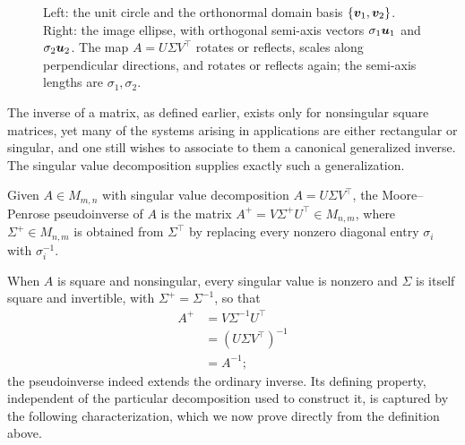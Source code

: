 \begin{figure}[!htbp]
\centering
{}
\caption[Singular Value Decomposition (SVD)]{Left: the unit circle and the orthonormal domain basis $\{\bm{v}_1,\bm{v}_2\}$. Right: the image ellipse, with orthogonal semi-axis vectors $\sigma_1\bm{u}_1$ and $\sigma_2\bm{u}_2$. The map $A=U\Sigma V^\top$ rotates or reflects, scales along perpendicular directions, and rotates or reflects again; the semi-axis lengths are $\sigma_1,\sigma_2$.}
\label{fig:ch10-svd}
\end{figure}

The inverse of a matrix, as defined earlier, exists only for nonsingular square matrices, yet many of the systems arising in applications are either rectangular or singular, and one still wishes to associate to them a canonical generalized inverse. The singular value decomposition supplies exactly such a generalization.

\begin{definition}[Pseudoinverse]
Given $A \in M_{m,n}$ with singular value decomposition $A = U\Sigma V^{\top}$, the Moore--Penrose pseudoinverse of $A$ is the matrix $A^{+} = V \Sigma^{+} U^{\top} \in M_{n,m}$, where $\Sigma^{+} \in M_{n,m}$ is obtained from $\Sigma^{\top}$ by replacing every nonzero diagonal entry $\sigma_i$ with $\sigma_i^{-1}$.
\end{definition}

When $A$ is square and nonsingular, every singular value is nonzero and $\Sigma$ is itself square and invertible, with $\Sigma^{+} = \Sigma^{-1}$, so that
\[
\begin{aligned}
A^{+} &= V\Sigma^{-1}U^{\top} \\
&= (U\Sigma V^{\top})^{-1} \\
&= A^{-1};
\end{aligned}
\]
the pseudoinverse indeed extends the ordinary inverse. Its defining property, independent of the particular decomposition used to construct it, is captured by the following characterization, which we now prove directly from the definition above.

